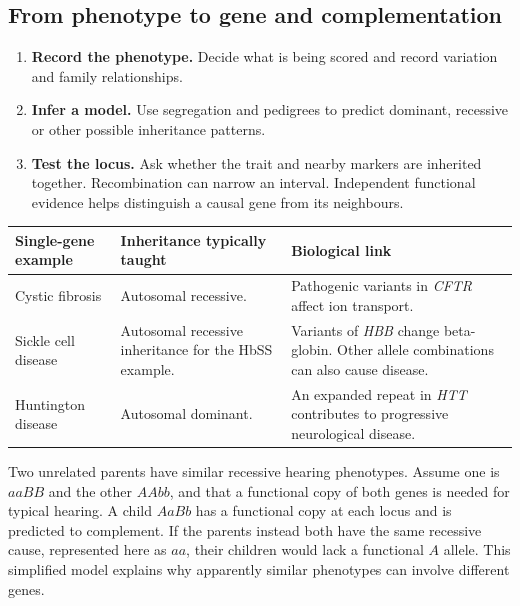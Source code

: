 \documentclass[12pt,a4paper]{article}
\begin{document}
\subsection{From phenotype to gene and complementation}
\begin{enumerate}[leftmargin=*, itemsep=3pt, topsep=4pt]
  \item \textbf{Record the phenotype.} Decide what is being scored and record variation and family relationships.
  \item \textbf{Infer a model.} Use segregation and pedigrees to predict dominant, recessive or other possible inheritance patterns.
  \item \textbf{Test the locus.} Ask whether the trait and nearby markers are inherited together. Recombination can narrow an interval. Independent functional evidence helps distinguish a causal gene from its neighbours.
\end{enumerate}
\par\vspace{5pt}
\begingroup
\setlength{\extrarowheight}{1pt}
\noindent\begin{tabularx}{\linewidth}{|B{3.2cm}|Y|Y|}
\hline
\textbf{Single-gene example} & \textbf{Inheritance typically taught} & \textbf{Biological link} \\ \hline
Cystic fibrosis & Autosomal recessive. & Pathogenic variants in \textit{CFTR} affect ion transport. \\ \hline
Sickle cell disease & Autosomal recessive inheritance for the HbSS example. & Variants of \textit{HBB} change beta-globin. Other allele combinations can also cause disease. \\ \hline
Huntington disease & Autosomal dominant. & An expanded repeat in \textit{HTT} contributes to progressive neurological disease. \\ \hline
\end{tabularx}\par
\endgroup
\begin{tcolorbox}[examplebox, title={Human genetics thought experiment: complementation}]
Two unrelated parents have similar recessive hearing phenotypes. Assume one is $aaBB$ and the other $AAbb$, and that a functional copy of both genes is needed for typical hearing. A child $AaBb$ has a functional copy at each locus and is predicted to complement. If the parents instead both have the same recessive cause, represented here as $aa$, their children would lack a functional $A$ allele. This simplified model explains why apparently similar phenotypes can involve different genes.
\end{tcolorbox}
\end{document}
